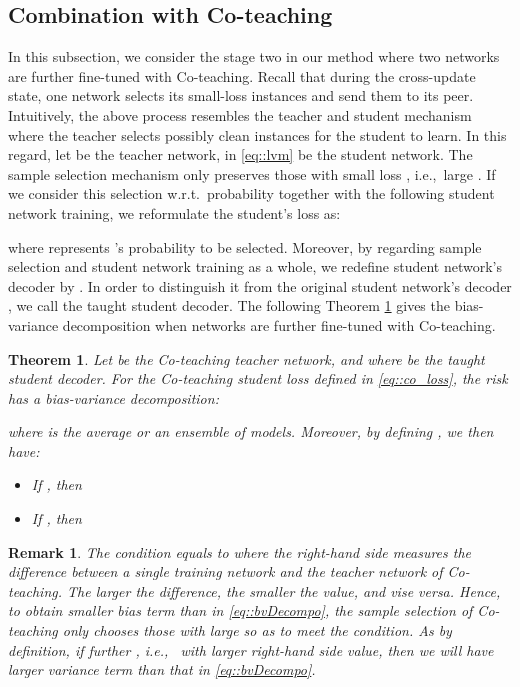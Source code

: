 \documentclass[journal]{IEEEtran}
\newtheorem{theorem}{Theorem}
\newtheorem{remark}{Remark}
\begin{document}
\subsection{Combination with Co-teaching} \label{subsec::comco}
In this subsection, we consider the stage two in our method where 
two networks are further fine-tuned with Co-teaching.
Recall that during the cross-update state, one network selects its small-loss instances  and send them to its peer.
Intuitively, the above process resembles the teacher and student mechanism where the teacher selects possibly clean instances for the student to learn.
In this regard, let  be the teacher network,  in \eqref{eq::lvm} be the student network.
The sample selection mechanism only preserves those with small loss , i.e.,~large .
If we consider this selection w.r.t.~probability together with the following student network training, we reformulate the student's loss as:

where  represents 's probability to be selected.
Moreover, by regarding sample selection and student network training as a whole, we redefine student network's decoder by
.
In order to distinguish it from the original student network's decoder , we call  the taught student decoder.
The following Theorem \ref{thm::co_decomp} gives the bias-variance decomposition when networks are further fine-tuned with Co-teaching.

\begin{theorem} \label{thm::co_decomp}
    Let  be the Co-teaching teacher network, and  where  be the taught student decoder. 
    For the Co-teaching student loss  defined in \eqref{eq::co_loss}, the risk has a bias-variance decomposition:
    
    where  is the average or an ensemble of models. 
    Moreover, by defining , we then have:
    \begin{itemize}
        \item[\textit{(i)}] If , then
        
        \item[\textit{(ii)}] If , then
        
    \end{itemize}
\end{theorem}

\begin{remark} \label{rk::co_bv}
    The condition  equals to  where the right-hand side measures the difference between a single training network  and the teacher network  of Co-teaching. 
    The larger the difference, the smaller the value, and vise versa.
    Hence, to obtain smaller bias term than in \eqref{eq::bvDecompo}, the sample selection of Co-teaching only chooses those  with large  so as to meet the condition.
    As  by definition, if further , i.e.,~ with larger right-hand side value, then we will have larger variance term than that in \eqref{eq::bvDecompo}.
\end{remark}
\end{document}
